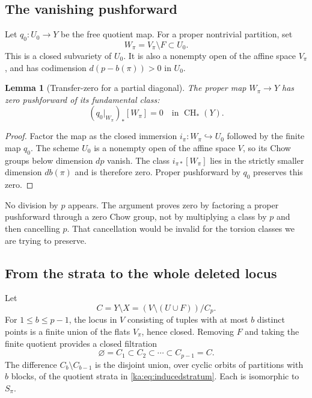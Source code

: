 \documentclass[11pt,a4paper]{article}
\newtheorem{lemma}[theorem]{Lemma}
\theoremstyle{definition}
\theoremstyle{remark}
\newcommand{\CH}{\operatorname{CH}}
\begin{document}
\subsection{The vanishing pushforward}
Let $q_0:U_0\to Y$ be the free quotient map. For a proper nontrivial
partition, set
\[
 W_\pi=V_\pi\setminus F\subset U_0.
\]
This is a closed subvariety of $U_0$. It is also a nonempty open of the
affine space $V_\pi$, and has codimension $d(p-b(\pi))>0$ in $U_0$.

\begin{lemma}[Transfer-zero for a partial diagonal]
\label{ka:lem:transferzero}
The proper map $W_\pi\to Y$ has zero pushforward of its fundamental
class:
\begin{equation}
 (q_0|_{W_\pi})_*[W_\pi]=0\quad\text{in }\CH_*(Y).
 \label{ka:eq:transferzero}
\end{equation}
\end{lemma}
\begin{proof}
Factor the map as the closed immersion
$i_\pi:W_\pi\hookrightarrow U_0$ followed by the finite map $q_0$.
The scheme $U_0$ is a nonempty open of the affine space $V$, so its
Chow groups below dimension $dp$ vanish. The class
$i_{\pi*}[W_\pi]$ lies in the strictly smaller dimension $db(\pi)$ and
is therefore zero. Proper pushforward by $q_0$ preserves this zero.
\end{proof}

No division by $p$ appears. The argument proves zero by factoring a
proper pushforward through a zero Chow group, not by multiplying a class
by $p$ and then cancelling $p$. That cancellation would be invalid for
the torsion classes we are trying to preserve.

\subsection{From the strata to the whole deleted locus}
Let
\[
 C=Y\setminus X=(V\setminus(U\cup F))/C_p.
\]
For $1\leq b\leq p-1$, the locus in $V$ consisting of tuples with at
most $b$ distinct points is a finite union of the flats $V_\pi$, hence
closed. Removing $F$ and taking the finite quotient provides a closed
filtration
\[
 \varnothing=C_1\subset C_2\subset\cdots\subset C_{p-1}=C.
\]
The difference $C_b\setminus C_{b-1}$ is the disjoint union, over cyclic
orbits of partitions with $b$ blocks, of the quotient strata in
\eqref{ka:eq:inducedstratum}. Each is isomorphic to $S_\pi$.
\end{document}
